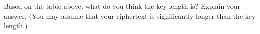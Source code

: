 \documentclass[10pt,a4paper]{article}
\begin{document}
\begin{enumerate}
Based on the table above, what do you think the key length is?  Explain your answer. (You may assume that your ciphertext is significantly longer than the key length.)

\end{enumerate}
\end{document}
